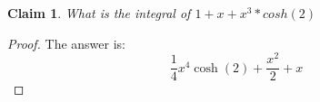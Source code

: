 \documentclass{article}
\newtheorem{theorem}{Claim}
\begin{document}
\begin{theorem}
What is the integral of $ 1 + x + x^3*cosh(2) $
\end{theorem}

\begin{proof}
The answer is:
\[
\frac{1}{4} x^4 \cosh (2)+\frac{x^2}{2}+x
\]
\end{proof}
\end{document}
